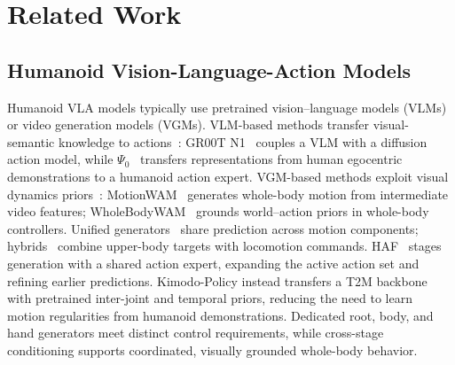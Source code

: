 \section{Related Work}
\label{sec:related_work}


% 

\subsection{Humanoid Vision-Language-Action Models}
Humanoid VLA models typically use pretrained vision--language models (VLMs) or video generation models (VGMs).
VLM-based methods transfer visual-semantic knowledge to actions~\cite{grootn1,psi0,humanoidexo,openhlm}: GR00T N1~\cite{grootn1} couples a VLM with a diffusion action model, while $\Psi_0$~\cite{psi0} transfers representations from human egocentric demonstrations to a humanoid action expert.
VGM-based methods exploit visual dynamics priors~\cite{motionwam,wholebodywam_wbc}: MotionWAM~\cite{motionwam} generates whole-body motion from intermediate video features; WholeBodyWAM~\cite{wholebodywam_wbc} grounds world--action priors in whole-body controllers.
Unified generators~\cite{openhlm,motionwam} share prediction across motion components; hybrids~\cite{humanoidexo,wholebodyvla} combine upper-body targets with locomotion commands.
HAF~\cite{haf} stages generation with a shared action expert, expanding the active action set and refining earlier predictions.
Kimodo-Policy instead transfers a T2M backbone with pretrained inter-joint and temporal priors, reducing the need to learn motion regularities from humanoid demonstrations. Dedicated root, body, and hand generators meet distinct control requirements, while cross-stage conditioning supports coordinated, visually grounded whole-body behavior.

% 

